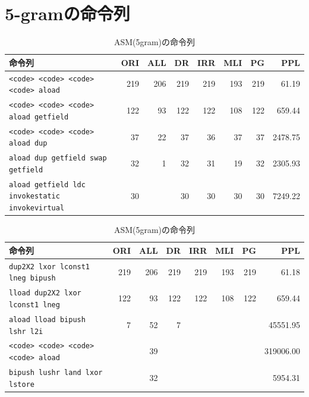 \documentclass[12pt,twoside]{jbook}
\begin{document}
\chapter{5-gramの命令列}
\begin{table}[t]
  \centering
  \footnotesize{
    \caption{ASM(5gram)の命令列}\label{table:asm}
  \begin{tabular}{lrrrrrrr}
   命令列 &
    \multicolumn{1}{p{1cm}}{ORI} & 
    \multicolumn{1}{p{1cm}}{ALL} & 
    \multicolumn{1}{p{1cm}}{DR} & 
    \multicolumn{1}{p{1cm}}{IRR} & 
    \multicolumn{1}{p{1cm}}{MLI} & 
    \multicolumn{1}{p{1cm}}{PG} & 
    \multicolumn{1}{p{1cm}}{PPL} \\ \hline
    \texttt{<code> <code> <code> <code> aload}             & 219 & 206 & 219 & 219 & 193 & 219 & 61.19 \\
    \texttt{<code> <code> <code> aload getfield}           & 122 &  93 & 122 & 122 & 108 & 122 & 659.44 \\
    \texttt{<code> <code> <code> aload dup}                & 37  &  22 &  37 &  36 &  37 &  37 & 2478.75 \\
    \texttt{aload dup getfield swap getfield} 　           & 32  &   1 &  32 &  31 &  19 &  32 & 2305.93 \\
    \texttt{aload getfield ldc invokestatic invokevirtual} & 30  &     &  30 &  30 &  30 &  30 & 7249.22 \\
  \end{tabular}
  
  \begin{tabular}{lrrrrrrr}
   命令列 &
    \multicolumn{1}{p{1cm}}{ORI} & 
    \multicolumn{1}{p{1cm}}{ALL} & 
    \multicolumn{1}{p{1cm}}{DR} & 
    \multicolumn{1}{p{1cm}}{IRR} & 
    \multicolumn{1}{p{1cm}}{MLI} & 
    \multicolumn{1}{p{1cm}}{PG} & 
    \multicolumn{1}{p{1cm}}{PPL} \\ \hline
    \texttt{dup2X2 lxor lconst1 lneg bipush}   & 219 & 206 & 219 & 219 & 193 & 219 & 61.18 \\
    \texttt{lload dup2X2 lxor lconst1 lneg}    & 122 &  93 & 122 & 122 & 108 & 122 & 659.44 \\
    \texttt{aload lload bipush lshr l2i}       & 7   &  52 &   7 &     &     &     & 45551.95 \\
    \texttt{<code> <code> <code> <code> aload} &     &  39 &     &     &     &     & 319006.00 \\
    \texttt{bipush lushr land lxor lstore}     &     &  32 &     &     &     &     & 5954.31 \\
  \end{tabular}
  
}
\end{table}
\end{document}
